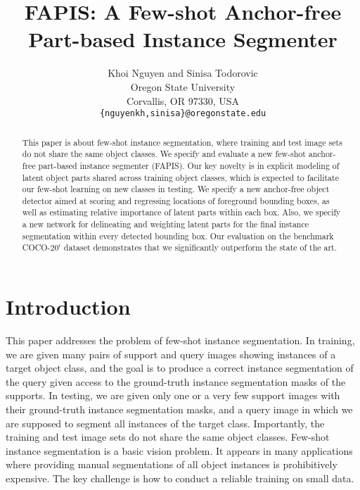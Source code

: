\documentclass[final]{cvpr}
\def\Approach{FAPIS}
\begin{document}
\title{FAPIS: A Few-shot Anchor-free Part-based Instance Segmenter}
\author{Khoi Nguyen and Sinisa Todorovic\\
Oregon State University\\
Corvallis, OR 97330, USA\\
{\tt\small {\{nguyenkh,sinisa\}}@oregonstate.edu}
}


\maketitle

\thispagestyle{empty}

\begin{abstract}
This paper is about few-shot instance segmentation, where training and test image sets do not share the same object classes. 
We specify and evaluate a new few-shot anchor-free part-based instance segmenter (\Approach). Our key novelty is in explicit modeling of latent object parts shared across training object classes, which is expected to facilitate our few-shot learning on new classes in testing. We specify a new anchor-free object detector aimed at scoring and regressing locations of foreground bounding boxes, as well as estimating relative importance of latent parts within each box. Also, we specify  a new network for delineating and weighting latent parts for the final instance segmentation within every detected bounding box. Our evaluation on the benchmark COCO-$20^i$ dataset demonstrates that we significantly outperform the state of the art. 
\end{abstract}


\section{Introduction}\label{sec:intro}

This paper addresses the problem of few-shot instance segmentation. In training, we are given many pairs of support and query images showing instances of a  target object  class, and the goal is to produce a correct instance segmentation of  the query given access to the ground-truth instance segmentation masks of the supports. In testing, we are given only one or a very few support images with their ground-truth instance segmentation masks, and a query image in which we are supposed to segment all instances of the target class. Importantly, the training and test image sets do not share the same object classes. Few-shot instance segmentation is a basic vision problem. It appears in many applications where providing manual segmentations of all object instances is prohibitively expensive. The key challenge is how to conduct a reliable  training on small data.
\end{document}
